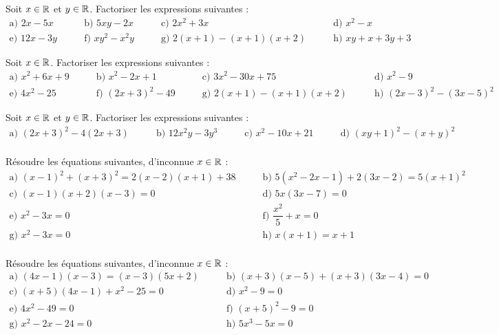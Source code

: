 \documentclass[a4paper,11pt,DIV15,BCOR0mm]{scrartcl}
\begin{document}
\renewcommand{\arraystretch}{2}
\begin{exercice}
Soit $x\in\mathbb{R}$ et $y\in\mathbb{R}$. Factoriser les expressions suivantes :
\[
\begin{array}{llll}
\text{a) }2x-5x & \qquad\text{b) }5xy-2x & 
\qquad\text{c) }2x^2+3x & \qquad\text{d) }x^2-x\\
\text{e) }12x-3y& \qquad\text{f) }xy^2-x^2y& 
\qquad\text{g) }2(x+1)-(x+1)(x+2)&\qquad\text{h) }xy+x+3y+3
\end{array}
\]
\end{exercice}

\begin{exercice}
Soit $x\in\mathbb{R}$. Factoriser les expressions suivantes :
\[
\begin{array}{llll}
\text{a) }x^2+6x+9 & \qquad\text{b) }x^2-2x+1 & 
\qquad\text{c) }3x^2-30x+75 & \qquad\text{d) }x^2-9\\
\text{e) }4x^2-25& \qquad\text{f) }(2x+3)^2-49& 
\qquad\text{g) }2(x+1)-(x+1)(x+2)&\qquad\text{h) }(2x-3)^2-(3x-5)^2
\end{array}
\]

\end{exercice}

\begin{exercice}
Soit $x\in\mathbb{R}$ et $y\in\mathbb{R}$. Factoriser les expressions suivantes :
\[
\begin{array}{llll}
\text{a) }(2x+3)^2-4(2x+3) & \qquad\text{b) }12x^2y-3y^3 & 
\qquad\text{c) }x^2-10x+21 & \qquad\text{d) }(xy+1)^2-(x+y)^2\\
\end{array}
\]
\end{exercice}


\begin{exercice}
Résoudre les équations suivantes, d'inconnue $x\in\mathbb{R}$ :
\[
\begin{array}{ll}
\text{a) }(x-1)^2+(x+3)^2=2(x-2)(x+1)+38 & \qquad\text{b) }5(x^2-2x-1)+2(3x-2)=5(x+1)^2 \\ 
\text{c) }(x-1)(x+2)(x-3)=0 & \qquad\text{d) }5x(3x-7)=0\\
\text{e) }x^2-3x=0 & \qquad\text{f) }\dfrac{x^2}{5}+x=0\\
\text{g) }x^2-3x=0 & \qquad\text{h) }x(x+1)=x+1\\
\end{array}
\]
\end{exercice}

\begin{exercice}
Résoudre les équations suivantes, d'inconnue $x\in\mathbb{R}$ :
\[
\begin{array}{ll}
\text{a) }(4x-1)(x-3)=(x-3)(5x+2) & \qquad\text{b) }(x+3)(x-5)+(x+3)(3x-4)=0 \\ 
\text{c) }(x+5)(4x-1)+x^2-25=0 & \qquad\text{d) }x^2-9=0\\
\text{e) }4x^2-49=0 & \qquad\text{f) }(x+5)^2-9=0\\
\text{g) }x^2-2x-24=0 & \qquad\text{h) }5x^3-5x=0\\
\end{array}
\]
\end{exercice}
\end{document}
